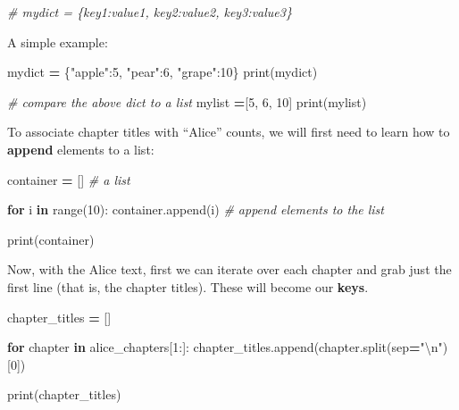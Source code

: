 \documentclass[
]{book}
\newenvironment{Shaded}{\begin{snugshade}}{\end{snugshade}}
\newcommand{\BuiltInTok}[1]{#1}
\newcommand{\CharTok}[1]{\textcolor[rgb]{0.31,0.60,0.02}{#1}}
\newcommand{\CommentTok}[1]{\textcolor[rgb]{0.56,0.35,0.01}{\textit{#1}}}
\newcommand{\ControlFlowTok}[1]{\textcolor[rgb]{0.13,0.29,0.53}{\textbf{#1}}}
\newcommand{\DecValTok}[1]{\textcolor[rgb]{0.00,0.00,0.81}{#1}}
\newcommand{\KeywordTok}[1]{\textcolor[rgb]{0.13,0.29,0.53}{\textbf{#1}}}
\newcommand{\NormalTok}[1]{#1}
\newcommand{\OperatorTok}[1]{\textcolor[rgb]{0.81,0.36,0.00}{\textbf{#1}}}
\newcommand{\StringTok}[1]{\textcolor[rgb]{0.31,0.60,0.02}{#1}}
\begin{document}
\begin{Shaded}
\begin{Highlighting}[]
\CommentTok{# mydict = \{key1:value1, key2:value2, key3:value3\}}
\end{Highlighting}
\end{Shaded}

A simple example:

\begin{Shaded}
\begin{Highlighting}[]
\NormalTok{mydict }\OperatorTok{=}\NormalTok{ \{}\StringTok{"apple"}\NormalTok{:}\DecValTok{5}\NormalTok{, }\StringTok{"pear"}\NormalTok{:}\DecValTok{6}\NormalTok{, }\StringTok{"grape"}\NormalTok{:}\DecValTok{10}\NormalTok{\}}
\BuiltInTok{print}\NormalTok{(mydict)}
\end{Highlighting}
\end{Shaded}

\begin{Shaded}
\begin{Highlighting}[]
\CommentTok{# compare the above dict to a list}
\NormalTok{mylist }\OperatorTok{=}\NormalTok{[}\DecValTok{5}\NormalTok{, }\DecValTok{6}\NormalTok{, }\DecValTok{10}\NormalTok{]}
\BuiltInTok{print}\NormalTok{(mylist)}
\end{Highlighting}
\end{Shaded}

To associate chapter titles with ``Alice'' counts, we will first need to learn how to \textbf{append} elements to a list:

\begin{Shaded}
\begin{Highlighting}[]
\NormalTok{container }\OperatorTok{=}\NormalTok{ [] }\CommentTok{# a list}

\ControlFlowTok{for}\NormalTok{ i }\KeywordTok{in} \BuiltInTok{range}\NormalTok{(}\DecValTok{10}\NormalTok{):}
\NormalTok{    container.append(i) }\CommentTok{# append elements to the list}

\BuiltInTok{print}\NormalTok{(container)    }
\end{Highlighting}
\end{Shaded}

Now, with the Alice text, first we can iterate over each chapter and grab just the first line (that is, the chapter titles). These will become our \textbf{keys}.

\begin{Shaded}
\begin{Highlighting}[]
\NormalTok{chapter_titles }\OperatorTok{=}\NormalTok{ []}

\ControlFlowTok{for}\NormalTok{ chapter }\KeywordTok{in}\NormalTok{ alice_chapters[}\DecValTok{1}\NormalTok{:]:}
\NormalTok{    chapter_titles.append(chapter.split(sep}\OperatorTok{=}\StringTok{"}\CharTok{\textbackslash{}n}\StringTok{"}\NormalTok{)[}\DecValTok{0}\NormalTok{])}

\BuiltInTok{print}\NormalTok{(chapter_titles)}
\end{Highlighting}
\end{Shaded}
\end{document}
